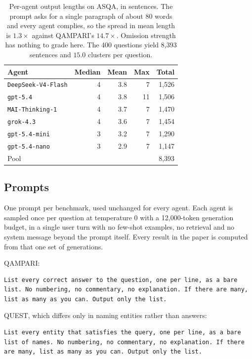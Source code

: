 \documentclass{article}
\begin{document}
\begin{table}
  \caption{Per-agent output lengths on ASQA, in sentences. The prompt asks for a single paragraph of about 80 words and every agent complies, so the spread in mean length is $1.3\times$ against QAMPARI's $14.7\times$. Omission strength has nothing to grade here. The 400 questions yield 8,393 sentences and $15.0$ clusters per question.}
  \label{tab:asqa-lengths}
  \centering
  \begin{tabular}{lrrrr}
    \toprule
    Agent & Median & Mean & Max & Total \\
    \midrule
    \texttt{DeepSeek-V4-Flash} & 4 & 3.8 &  7 & 1,526 \\
    \texttt{gpt-5.4}           & 4 & 3.8 & 11 & 1,506 \\
    \texttt{MAI-Thinking-1}    & 4 & 3.7 &  7 & 1,470 \\
    \texttt{grok-4.3}          & 4 & 3.6 &  7 & 1,454 \\
    \texttt{gpt-5.4-mini}      & 3 & 3.2 &  7 & 1,290 \\
    \texttt{gpt-5.4-nano}      & 3 & 2.9 &  7 & 1,147 \\
    \midrule
    Pool                       &   &     &    & 8,393 \\
    \bottomrule
  \end{tabular}
\end{table}

\subsection{Prompts}
\label{app:prompts}

One prompt per benchmark, used unchanged for every agent. Each agent is sampled once per question at temperature 0 with a 12,000-token generation budget, in a single user turn with no few-shot examples, no retrieval and no system message beyond the prompt itself. Every result in the paper is computed from that one set of generations.

QAMPARI:
\begin{verbatim}
List every correct answer to the question, one per line, as a bare
list. No numbering, no commentary, no explanation. If there are many,
list as many as you can. Output only the list.
\end{verbatim}

QUEST, which differs only in naming entities rather than answers:
\begin{verbatim}
List every entity that satisfies the query, one per line, as a bare
list of names. No numbering, no commentary, no explanation. If there
are many, list as many as you can. Output only the list.
\end{verbatim}
\end{document}
